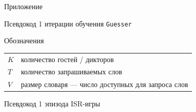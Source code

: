 \documentclass[aspectratio=43]{beamer}
\newcommand{\guesser}{\texttt{Guesser}}
\begin{document}
\begin{frame}{}
    \centering
    \Huge
    Приложение
\end{frame}

\begin{frame}{Псевдокод 1 итерации обучения
                                                \guesser{}}

    \begin{block}{Обозначения}
    \begin{tabular}{l l}
        $K$ & количество гостей / дикторов\\
        $T$ & количество запрашиваемых слов\\
        $V$ & размер словаря --- число доступных для запроса слов
    \end{tabular}
    \end{block}
\end{frame}

\begin{frame}{Псевдокод 1 эпизода ISR-игры}
\footnotesize

\end{frame}
\end{document}
